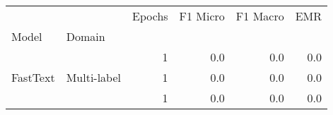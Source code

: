 \begin{tabular}{llrrrr}
\toprule
         &             &  Epochs &  F1 Micro &   F1 Macro &  EMR \\
Model & Domain &         &           &            &      \\
\midrule
\multirow{3}{*}{FastText} & \multirow{3}{*}{Multi-label} &       1 &       0.0 &        0.0 &  0.0 \\
         &             &       1 &       0.0 &        0.0 &  0.0 \\
         &             &       1 &       0.0 &        0.0 &  0.0 \\
\bottomrule
\end{tabular}
